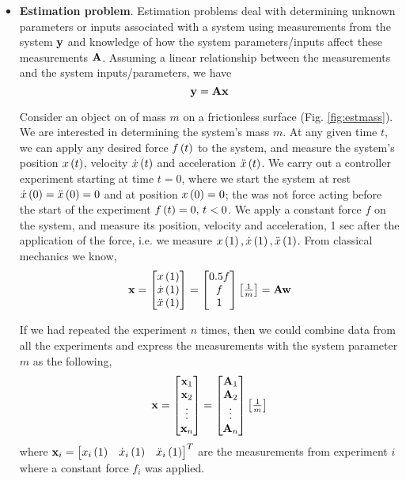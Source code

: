 \begin{itemize}
    \item \textbf{Estimation problem}. Estimation problems deal with  determining unknown parameters or inputs associated with a system using measurements from the system $\mathbf{y}$ and knowledge of how the system parameters/inputs affect these measurements $\mathbf{A}$. Assuming a linear relationship between the measurements and the system inputs/parameters, we have
    \[ \mathbf{y} = \mathbf{A}\mathbf{x} \]
    \begin{example}[frametitle=Estimating Mass of an Object]\label{ex:est}
    Consider an object on of mass $m$ on a frictionless surface (Fig. \ref{fig:estmass}). We are interested in determining the system's mass $m$. At any given time $t$, we can apply any desired force $f\left( t\right)$ to the system, and measure the system's position $x\left( t\right)$, velocity $\dot{x}\left( t\right)$ and acceleration $\ddot{x}\left( t\right)$. We carry out a controller experiment starting at time $t=0$, where we start the system at rest $\dot{x}\left( 0\right) = \ddot{x}\left( 0\right) = 0$ and at position $x\left( 0\right)=0$; the was not force acting before the start of the experiment $f\left( t\right) = 0, \, t < 0$. We apply a constant force $f$ on the system, and measure its position, velocity and acceleration, 1 sec after the application of the force, i.e. we measure $x\left( 1\right), \dot{x}\left( 1\right), \ddot{x}\left( 1\right)$. From classical mechanics we know, 
    \[ \mf{x} = \bmxc x\ct{1} \\ \dot{x}\ct{1} \\ \ddot{x}\ct{1} \emx = \bmxc 0.5f \\ f \\ 1 \emx \bmxc \frac{1}{m}\emx = \mf{A}\mf{w} \]

    If we had repeated the experiment $n$ times, then we could combine data from all the experiments and express the measurements with the system parameter $m$ as the following,
    \[ \mf{x} = \bmxc \mf{x}_1 \\ \mf{x}_2 \\ \vdots \\ \mf{x}_n \emx = \bmxc \mf{A}_1 \\ \mf{A}_2 \\ \vdots \\ \mf{A}_n \emx \bmxc \frac{1}{m} \emx \]
    where $\mf{x}_i = \bmxc x_i\ct{1} & \dot{x}_i\ct{1} & \ddot{x}_i\ct{1} \emx^T$ are the measurements from experiment $i$ where a constant force $f_i$ was applied.

    \end{example}


\end{itemize}
